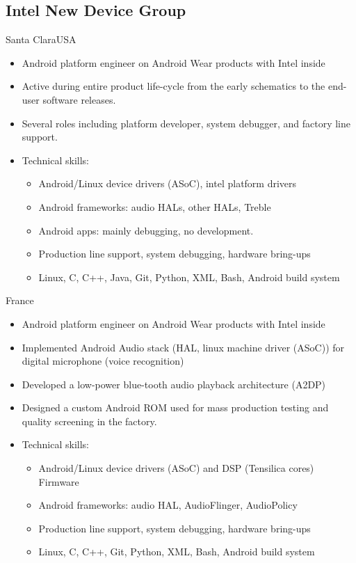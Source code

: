 \documentclass[a4paper,10pt,sans]{moderncv}
\begin{document}
\subsection{Intel New Device Group}
{Santa Clara}{USA}
{%
  \begin{itemize}
  \item Android platform engineer on Android Wear products with Intel inside
  \item Active during entire product life-cycle from the early schematics to the end-user software releases.
  \item Several roles including platform developer, system debugger, and factory line support.
  \item Technical skills:
    \begin{itemize}
    \item Android/Linux device drivers (ASoC), intel platform drivers
    \item Android frameworks: audio HALs, other HALs, Treble
    \item Android apps: mainly debugging, no development.
    \item Production line support, system debugging, hardware bring-ups
    \item Linux, C, C++, Java, Git, Python, XML, Bash, Android build system
    \end{itemize}
  \end{itemize}
}

{}{France}
{
    \begin{itemize}
    \item Android platform engineer on Android Wear products with Intel inside
    \item Implemented Android Audio stack (HAL, linux machine driver (ASoC)) for digital microphone (voice recognition)
    \item Developed a low-power blue-tooth audio playback architecture (A2DP)
    \item Designed a custom Android ROM used for mass production testing and quality screening in the factory.
    \item Technical skills:
      \begin{itemize}
        \item Android/Linux device drivers (ASoC) and DSP (Tensilica cores) Firmware
        \item Android frameworks: audio HAL, AudioFlinger, AudioPolicy
        \item Production line support, system debugging, hardware bring-ups
        \item Linux, C, C++, Git, Python, XML, Bash, Android build system
      \end{itemize}
    \end{itemize}
}
\end{document}
